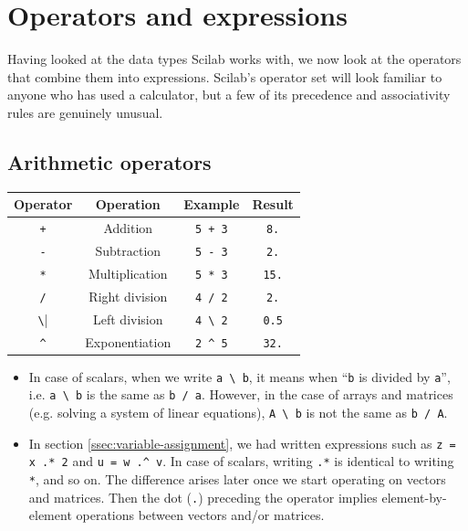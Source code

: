 \section{Operators and expressions}
	Having looked at the data types Scilab works with, we now look at the operators that combine them into expressions. Scilab's operator set will look familiar to anyone who has used a calculator, but a few of its precedence and associativity rules are genuinely unusual.

	\subsection{Arithmetic operators}
		\begin{table}[h!]
			\centering
			\begin{tabular}{cccc}
				\toprule[1.5pt]
				{\textbf{Operator}} & {\textbf{Operation}} & {\textbf{Example}} & {\textbf{Result}} \\
				\midrule[1.2pt]
				{\verb|+|} & {Addition} & {\verb|5 + 3|} & {\verb|8.|} \\ \hline
				{\verb|-|} & {Subtraction} & {\verb|5 - 3|} & {\verb|2.|} \\ \hline
				{\verb|*|} & {Multiplication} & {\verb|5 * 3|} & {\verb|15.|} \\ \hline
				{\verb|/|} & {Right division} & {\verb|4 / 2|} & {\verb|2.|} \\ \hline
				{\verb|\|} & {Left division} & {\verb|4 \ 2|} & {\verb|0.5|} \\ \hline
				{\verb|^|} & {Exponentiation} & {\verb|2 ^ 5|} & {\verb|32.|} \\
				\bottomrule[1.5pt]
			\end{tabular}
		\end{table}
		
		\begin{itemize}
			\item In case of scalars, when we write \verb|a \ b|, it means when ``\verb|b| is divided by \verb|a|'', i.e. \verb|a \ b| is the same as \verb|b / a|. However, in the case of arrays and matrices (e.g. solving a system of linear equations), \verb|A \ b| is not the same as \verb|b / A|.
			
			\item In section \ref{ssec:variable-assignment}, we had written expressions such as \verb|z = x .* 2| and \verb|u = w .^ v|. In case of scalars, writing \verb|.*| is identical to writing \verb|*|, and so on. The difference arises later once we start operating on vectors and matrices. Then the dot (\verb|.|) preceding the operator implies element-by-element operations between vectors and/or matrices.
		\end{itemize}
	
